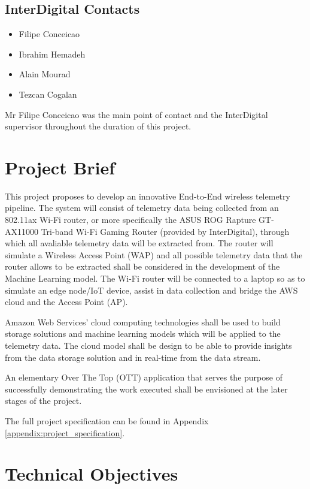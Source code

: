 \subsection{InterDigital Contacts}

\begin{itemize}
  \item Filipe Conceicao
  \item Ibrahim Hemadeh
  \item Alain Mourad
  \item Tezcan Cogalan
\end{itemize}

Mr Filipe Conceicao was the main point of contact and the InterDigital supervisor throughout the duration of this project.

\section{Project Brief}
\label{0_2_project_brief}
This project proposes to develop an innovative End-to-End wireless telemetry pipeline. The system will consist of telemetry data being collected from an 802.11ax Wi-Fi router, or more specifically the ASUS ROG Rapture GT-AX11000 Tri-band Wi-Fi Gaming Router \cite{ASUSRouter} (provided by InterDigital), through which all avaliable telemetry data will be extracted from. The router will simulate a Wireless Access Point (WAP) and all possible telemetry data that the router allows to be extracted shall be considered in the development of the Machine Learning model. The Wi-Fi router will be connected to a laptop so as to simulate an edge node/IoT device, assist in data collection and bridge the AWS cloud and the Access Point (AP). 

\noindent Amazon Web Services' cloud computing technologies shall be used to build storage solutions and machine learning models which will be applied to the telemetry data. The cloud model shall be design to be able to provide insights from the data storage solution and in real-time from the data stream. 

\noindent An elementary Over The Top (OTT) application that serves the purpose of successfully demonstrating the work executed shall be envisioned at the later stages of the project.

The full project specification can be found in Appendix \ref{appendix:project_specification}. 

\iffalse
\section{Technical Objectives}

